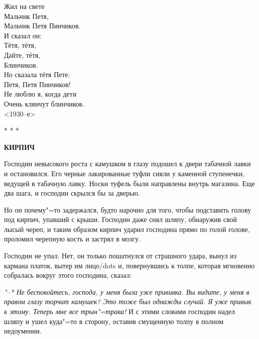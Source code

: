 \documentclass{article}
\begin{document}
\begin{flushright}
    \parbox{9cm}{ Жил на свете \\
        Мальчик Петя, \\
        Мальчик Петя Пинчиков. \\
        И сказал он:\\
        Тётя, тётя, \\
        Дайте, тётя, \\
        Блинчиков. \\

        Но сказала тётя Пете: \\
        Петя, Петя Пинчиков! \\
        Не люблю я, когда дети\\
        Очень клянчут блинчиков. \\

        \hspace{3cm}<1930--е>
    }

\end{flushright}

\begin{center}* * *\end{center}

\begin{center} \textbf{КИРПИЧ}\end{center}

Господин невысокого роста с камушком в глазу подошел к двери табачной лавки и
остановился. Его черные лакированные туфли сияли у каменной ступенечки, ведущей
в табачную лавку. Носки туфель были направлены внутрь магазина. Еще два шага, и
господин скрылся бы за дверью.

Но он почему"=то задержался, будто нарочно для того, чтобы подставить голову под
кирпич, упавший с крыши. Господин даже снял шляпу, обнаружив свой лысый череп, и
таким образом кирпич ударил господина прямо по голой голове, проломил черепную
кость и застрял в мозгу.

Господин не упал. Нет, он только пошатнулся от страшного удара, вынул из кармана
платок, вытер им лицо/dots и, повернувшись к толпе, которая мгновенно собралась
вокруг этого господина, сказал:

\textit{"--* Не беспокойтесь, господа, у меня была уже прививка. Вы видите, у
    меня в правом глазу торчит камушек? Это тоже был однажды случай. Я уже
    привык к этому. Теперь мне все трын"=трава!} И с этими словами господин
надел шляпу и ушел куда"=то в сторону, оставив смущенную толпу в полном
недоумении.
\end{document}
